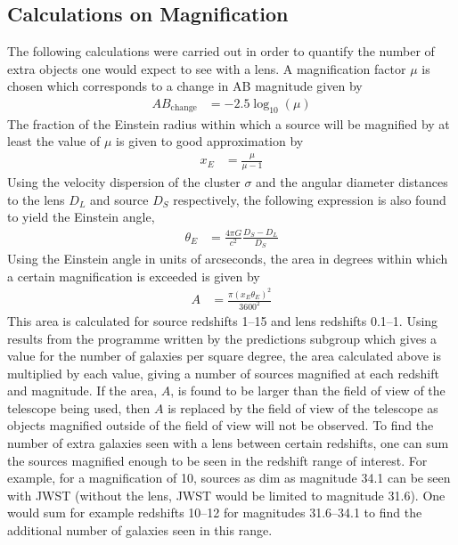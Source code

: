 
\subsection{Calculations on Magnification} %
\label{sub:calculations_on_magnification}
	The following calculations were carried out in order to quantify the number of extra objects one would expect to see with a lens. A magnification factor $\mu$ is chosen which corresponds to a change in AB magnitude given by
	\begin{align}
		AB_\text{change} &= -2.5\log_{10}(\mu)
	\end{align}
	The fraction of the Einstein radius within which a source will be magnified by at least the value of $\mu$ is given to good approximation by\cite{Lens_mass_estimate}
	\begin{align}
		x_E &= \frac{\mu}{\mu -1}
	\end{align}
	Using the velocity dispersion of the cluster $\sigma$ and the angular diameter distances to the lens $D_L$ and source $D_S$ respectively, the following expression is also found to yield the Einstein angle,
	\begin{align}
		\theta_E &= \frac{4\pi G}{c^2}\frac{D_S-D_L}{D_S}
	\end{align}
	Using the Einstein angle in units of arcseconds, the area in degrees within which a certain magnification is exceeded is given by
	\begin{align}
		A &= \frac{\pi(x_E \theta_E)^2}{3600^2}
	\end{align}
	This area is calculated for source redshifts 1--15 and lens redshifts 0.1--1. Using results from the programme written by the predictions subgroup which gives a value for the number of galaxies per square degree, the area calculated above is multiplied by each value, giving a number of sources magnified at each redshift and magnitude. If the area, $A$, is found to be larger than the field of view of the telescope being used, then $A$ is replaced by the field of view of the telescope as objects magnified outside of the field of view will not be observed. To find the number of extra galaxies seen with a lens between certain redshifts, one can sum the sources magnified enough to be seen in the redshift range of interest. For example, for a magnification of 10, sources as dim as magnitude 34.1 can be seen with JWST (without the lens, JWST would be limited to magnitude 31.6). One would sum for example redshifts 10--12 for magnitudes 31.6--34.1 to find the additional number of galaxies seen in this range.

